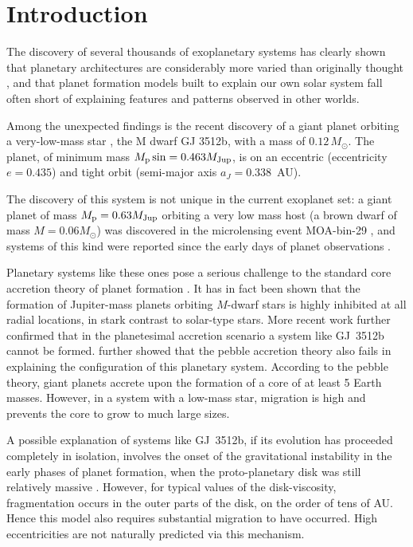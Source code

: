 \documentclass[twocolumn]{aastex62}
\begin{document}
\section{Introduction}

The discovery of several thousands of exoplanetary systems
has clearly shown that planetary architectures are
considerably more varied than originally thought \citep{Bathala2013}, and
that planet formation models built to explain our
own solar system fall often short of explaining
features and patterns observed in other worlds.

Among the unexpected findings is the recent
discovery of a giant planet orbiting a very-low-mass
star \citep{Morales2019}, the M dwarf GJ 3512b, with a mass of $0.12\,M_\odot$.
The planet, of minimum mass $M_{\rm p}\sin =0.463M_{\rm Jup}$, 
is on an eccentric (eccentricity $e=0.435$) and
tight orbit (semi-major axis $a_J=0.338$~AU).

The discovery of this system is not unique in the current exoplanet set: a giant planet of mass $M_{\rm p}=0.63 M_{\rm Jup}$ 
orbiting a very low mass host (a brown dwarf of mass $M=0.06 M_\odot$) was discovered in the microlensing event MOA-bin-29 \citep{Kondo2019}, and systems of this kind were reported since the early days of planet observations \citep{Delfosse1998}.

Planetary systems like these ones pose a serious challenge to the standard core accretion theory of planet formation \citep{Mizuno1980,
Bodenheimer1986,
Laughlin2004}.
It has in fact been shown \citep{Laughlin2004} that the formation of Jupiter-mass planets orbiting $M$-dwarf stars is highly inhibited at all radial locations, in stark contrast to solar-type stars. 
More recent work \citep{Miguel2019} further confirmed that in the planetesimal accretion scenario a system like GJ~3512b cannot be formed.
\citet{Morales2019} further showed that the pebble accretion theory \citep{Johansen2019} also fails in explaining the configuration of this planetary  system. According to the pebble theory, giant planets accrete upon the formation of a core of at least 5 Earth masses. However, in a system with a low-mass star, migration is high and prevents the core to grow to much large sizes.

A possible explanation of systems like GJ~3512b, if its evolution has
proceeded completely in isolation, involves the onset of the
gravitational instability in the early phases of planet formation,
when the proto-planetary disk was still relatively massive
\citep{Boss2006,Morales2019}. However, for typical values of the disk-viscosity,
fragmentation occurs in the outer parts of the disk, on the order of
tens of AU.  Hence this model also requires substantial migration to
have occurred. High eccentricities are not naturally predicted
via this mechanism.
\end{document}
